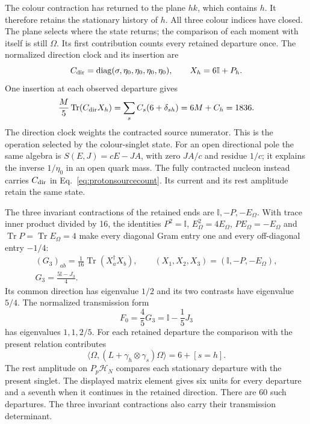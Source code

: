 \documentclass[aps,prx,onecolumn,10pt,notitlepage,nofootinbib,longbibliography]{revtex4-2}
\numberwithin{equation}{section}
\numberwithin{table}{section}
\newcommand{\Id}{\mathbb I}
\newcommand{\Tr}{\operatorname{Tr}}
\newcommand{\diag}{\operatorname{diag}}
\begin{document}
The colour contraction has returned to the plane $hk$, which contains $h$. It therefore retains the stationary history of $h$. All three colour indices have closed. The plane selects where the state returns; the comparison of each moment with itself is still $\Omega$. Its first contribution counts every retained departure once. The normalized direction clock and its insertion are
\begin{equation}
 C_{\rm dir}=\diag(\sigma,\eta_0,\eta_0,\eta_0,\eta_0),\qquad
 X_h=6\Id+P_h.
\end{equation}
One insertion at each observed departure gives
\begin{equation}
 \frac M5\Tr(C_{\rm dir}X_h)
 =\sum_s C_s(6+\delta_{sh})=6M+C_h=1836.
 \label{eq:protonsourcecount}
\end{equation}
The direction clock weights the contracted source numerator. This is the operation selected by the colour-singlet state. For an open directional pole the same algebra is $S(E,J)=cE-JA$, with zero $JA/c$ and residue $1/c$; it explains the inverse $1/\eta_0$ in an open quark mass. The fully contracted nucleon instead carries $C_{\rm dir}$ in Eq.~\eqref{eq:protonsourcecount}. Its current and its rest amplitude retain the same state.

The three invariant contractions of the retained ends are $\Id,-P,-E_\Omega$. With trace inner product divided by 16, the identities $P^2=\Id$, $E_\Omega^2=4E_\Omega$, $PE_\Omega=-E_\Omega$ and $\Tr P=\Tr E_\Omega=4$ make every diagonal Gram entry one and every off-diagonal entry $-1/4$:
\begin{equation}
 \begin{gathered}
 (G_3)_{ab}=\frac1{16}\Tr(X_a^\dagger X_b),\qquad
 (X_1,X_2,X_3)=(\Id,-P,-E_\Omega),\\
 G_3=\frac{5\Id-J_3}{4}.
 \end{gathered}
 \label{eq:protonpairgram}
\end{equation}
Its common direction has eigenvalue $1/2$ and its two contrasts have eigenvalue $5/4$. The normalized transmission form
\begin{equation}
 F_0=\frac45G_3=\Id-\frac15J_3
\end{equation}
has eigenvalues $1,1,2/5$. For each retained departure the comparison with the present relation contributes
\begin{equation}
 \langle\Omega,(L+\gamma_h\otimes\gamma_s)\Omega\rangle=6+[s=h].
\end{equation}
The rest amplitude on $P_p\mathcal H_N$ compares each stationary departure with the present singlet. The displayed matrix element gives six units for every departure and a seventh when it continues in the retained direction. There are 60 such departures. The three invariant contractions also carry their transmission determinant.
\end{document}
